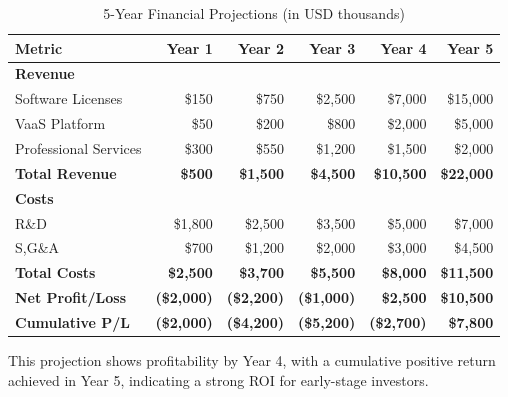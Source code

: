 \documentclass{article}
\begin{document}
\begin{table}[h!]
\centering
\begin{tabular}{|l|r|r|r|r|r|}
\hline
\textbf{Metric} & \textbf{Year 1} & \textbf{Year 2} & \textbf{Year 3} & \textbf{Year 4} & \textbf{Year 5} \\
\hline
\hline
\textbf{Revenue} & & & & & \\
Software Licenses & \$150 & \$750 & \$2,500 & \$7,000 & \$15,000 \\
VaaS Platform & \$50 & \$200 & \$800 & \$2,000 & \$5,000 \\
Professional Services & \$300 & \$550 & \$1,200 & \$1,500 & \$2,000 \\
\hline
\textbf{Total Revenue} & \textbf{\$500} & \textbf{\$1,500} & \textbf{\$4,500} & \textbf{\$10,500} & \textbf{\$22,000} \\
\hline
\hline
\textbf{Costs} & & & & & \\
R\&D & \$1,800 & \$2,500 & \$3,500 & \$5,000 & \$7,000 \\
S,G\&A & \$700 & \$1,200 & \$2,000 & \$3,000 & \$4,500 \\
\hline
\textbf{Total Costs} & \textbf{\$2,500} & \textbf{\$3,700} & \textbf{\$5,500} & \textbf{\$8,000} & \textbf{\$11,500} \\
\hline
\hline
\textbf{Net Profit/Loss} & \textbf{(\$2,000)} & \textbf{(\$2,200)} & \textbf{(\$1,000)} & \textbf{\$2,500} & \textbf{\$10,500} \\
\hline
\textbf{Cumulative P/L} & \textbf{(\$2,000)} & \textbf{(\$4,200)} & \textbf{(\$5,200)} & \textbf{(\$2,700)} & \textbf{\$7,800} \\
\hline
\end{tabular}
\caption{5-Year Financial Projections (in USD thousands)}
\end{table}

This projection shows profitability by Year 4, with a cumulative positive return achieved in Year 5, indicating a strong ROI for early-stage investors.
\end{document}
